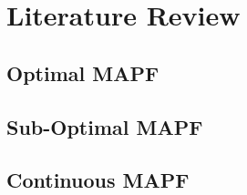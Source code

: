 \chapter{Literature Review}
\section{Optimal MAPF}
\section{Sub-Optimal MAPF}
\section{Continuous MAPF}

